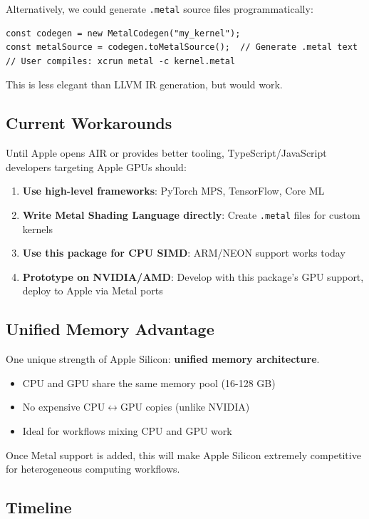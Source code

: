 \documentclass[11pt]{article}
\begin{document}
Alternatively, we could generate \texttt{.metal} source files programmatically\cite{metaltools}:
\begin{lstlisting}[style=ts]
const codegen = new MetalCodegen("my_kernel");
const metalSource = codegen.toMetalSource();  // Generate .metal text
// User compiles: xcrun metal -c kernel.metal
\end{lstlisting}

This is less elegant than LLVM IR generation, but would work.

\subsection{Current Workarounds}

Until Apple opens AIR or provides better tooling, TypeScript/JavaScript developers targeting Apple GPUs should:

\begin{enumerate}[noitemsep]
  \item \textbf{Use high-level frameworks}: PyTorch MPS, TensorFlow, Core ML
  \item \textbf{Write Metal Shading Language directly}: Create \texttt{.metal} files for custom kernels
  \item \textbf{Use this package for CPU SIMD}: ARM/NEON support works today
  \item \textbf{Prototype on NVIDIA/AMD}: Develop with this package's GPU support, deploy to Apple via Metal ports
\end{enumerate}

\subsection{Unified Memory Advantage}

One unique strength of Apple Silicon: \textbf{unified memory architecture}.

\begin{itemize}[noitemsep]
  \item CPU and GPU share the same memory pool (16-128 GB)
  \item No expensive CPU$\leftrightarrow$GPU copies (unlike NVIDIA)
  \item Ideal for workflows mixing CPU and GPU work
\end{itemize}

Once Metal support is added, this will make Apple Silicon extremely competitive for heterogeneous computing workflows.

\subsection{Timeline}
\end{document}
